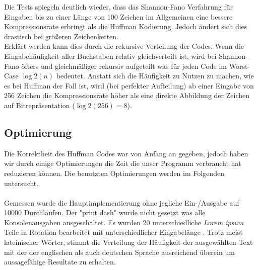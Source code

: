\documentclass[course=erap]{aspdoc}
\begin{document}
\begin{center}
\end{center}
Die Tests spiegeln deutlich wieder, dass das Shannon-Fano Verfahrung für Eingaben bis zu einer Länge von 100 Zeichen im Allgemeinen eine bessere Kompressionsrate erbringt als die Huffman Kodierung. Jedoch ändert sich dies drastisch bei größeren Zeichenketten.\\
Erklärt werden kann dies durch die rekursive Verteilung der Codes. Wenn die Eingabehäufigkeit aller Buchstaben relativ gleichverteilt ist, wird bei Shannon-Fano öfters und gleichmäßiger rekursiv aufgeteilt was für jeden Code im Worst-Case $\log2(n)$ bedeutet. Anstatt sich die Häufigkeit zu Nutzen zu machen, wie es bei Huffman der Fall ist, wird (bei perfekter Aufteilung) ab einer Eingabe von 256 Zeichen die Kompressionsrate höher als eine direkte Abbildung der Zeichen auf Bitrepräsentation ($\log2(256)=8$). \cite{1819Vorlesung15a}

\subsection{Optimierung}
Die Korrektheit des Huffman Codes war von Anfang an gegeben, jedoch haben wir durch einige Optimierungen die Zeit die unser Programm verbraucht hat reduzieren können. Die benutzten Optimierungen werden im Folgenden untersucht.\\\\
Gemessen wurde die Hauptimplementierung ohne jegliche Ein-/Ausgabe auf 10000 Durchläufen. Der "print dash" wurde nicht gesetzt was alle Konsolenausgaben ausgeschaltet. Es wurden 20 unterschiedliche \textit{Lorem ipsum} Teile %
in Rotation bearbeitet mit unterschiedlicher Eingabelänge . Trotz meist lateinischer Wörter, stimmt die Verteilung der Häufigkeit der ausgewählten Text mit der der englischen als auch deutschen Sprache ausreichend überein um aussagefähige Resultate zu erhalten.
\end{document}
